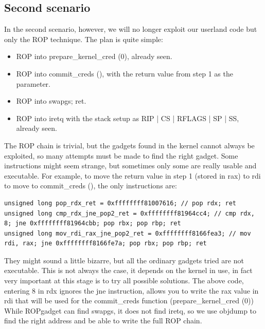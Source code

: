 \documentclass{masterthesis}
\begin{document}
\subsection{Second scenario}
In the second scenario, however, we will no longer exploit our userland code but only the ROP technique.
The plan is quite simple:
\begin{itemize}
\item ROP into prepare_kernel_cred (0), already seen.
\item ROP into commit_creds (), with the return value from step 1 as the parameter.
\item ROP into swapgs; ret.
\item ROP into iretq with the stack setup as RIP | CS | RFLAGS | SP | SS, already seen.
\end{itemize}
The ROP chain is trivial, but the gadgets found in the kernel cannot always be exploited, so many attempts must be made to find the right gadget.
Some instructions might seem strange, but sometimes only some are really usable and executable.
For example, to move the return value in step 1 (stored in rax) to rdi to move to commit_creds (), the only instructions are:
\begin{lstlisting}
unsigned long pop_rdx_ret = 0xffffffff81007616; // pop rdx; ret
unsigned long cmp_rdx_jne_pop2_ret = 0xffffffff81964cc4; // cmp rdx, 8; jne 0xffffffff81964cbb; pop rbx; pop rbp; ret
unsigned long mov_rdi_rax_jne_pop2_ret = 0xffffffff8166fea3; // mov rdi, rax; jne 0xffffffff8166fe7a; pop rbx; pop rbp; ret
\end{lstlisting}
They might sound a little bizarre, but all the ordinary gadgets tried are not executable.
This is not always the case, it depends on the kernel in use, in fact very important at this stage is to try all possible solutions.
The above code, entering 8 in rdx ignores the jne instruction, allows you to write the rax value in rdi that will be used for the commit_creds function (prepare_kernel_cred (0))
While ROPgadget can find swapgs, it does not find iretq, so we use objdump to find the right address and be able to write the full ROP chain.
\end{document}
